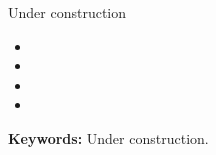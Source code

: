 \begin{abstracten}


\vspace{2em}

Under construction

\begin{center}
\begin{itemize}
\item  
\item 
\item  
\item 
\end{itemize}
{\bf \sf Keywords:} Under construction.                                  
\end{center}
\end{abstracten} 

